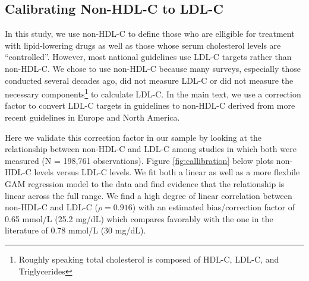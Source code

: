 \documentclass[12pt]{article}
\begin{document}
\begin{appendix}
\begin{landscape}
\end{landscape}
    
    \newpage

    \subsection{Calibrating Non-HDL-C to LDL-C}
    In this study, we use non-HDL-C to define those who are elligible for treatment with lipid-lowering drugs as well as those whose serum cholesterol levels are ``controlled''. However, most national guidelines use LDL-C targets rather than non-HDL-C. We chose to use non-HDL-C because many surveys, especially those conducted several decades ago, did not measure LDL-C or did not measure the necessary components\footnote{Roughly speaking total cholesterol is composed of HDL-C, LDL-C, and Triglycerides} to calculate LDL-C. In the main text, we use a correction factor to convert LDL-C targets in guidelines to non-HDL-C derived from more recent guidelines in Europe and North America. 
    
    Here we validate this correction factor in our sample by looking at the relationship between non-HDL-C and LDL-C among studies in which both were measured (N = 198,761 observations). Figure \ref{fig:callibration} below plots non-HDL-C levels versus LDL-C levels. We fit both a linear as well as a more flexbile GAM regression model to the data and find evidence that the relationship is linear across the full range. We find a high degree of linear correlation between non-HDL-C and LDL-C ($\rho = 0.916$) with an estimated bias/correction factor of 0.65 mmol/L (25.2 mg/dL) which compares favorably with the one in the literature of 0.78 mmol/L (30 mg/dL).


\end{appendix}
\end{document}
